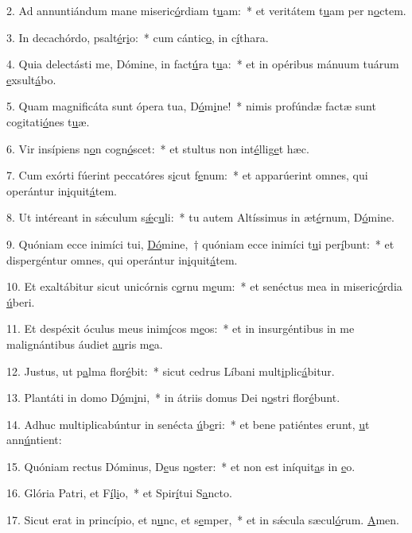 2. Ad annuntiándum mane miseric\uline{ó}rdiam t\uline{u}am:~* et veritátem t\uline{u}am per n\uline{o}ctem.\par 
3. In decachórdo, psalt\uline{é}r\uline{i}o:~* cum cántic\uline{o}, in c\uline{í}thara.\par 
4. Quia delectásti me, Dómine, in fact\uline{ú}ra t\uline{u}a:~* et in opéribus mánuum tuárum \uline{e}xsult\uline{á}bo.\par 
5. Quam magnificáta sunt ópera tua, D\uline{ó}m\uline{i}ne!~* nimis profúndæ factæ sunt cogitati\uline{ó}nes t\uline{u}æ.\par 
6. Vir insípiens n\uline{o}n cogn\uline{ó}scet:~* et stultus non int\uline{é}llig\uline{e}t hæc.\par 
7. Cum exórti fúerint peccatóres s\uline{i}cut f\uline{e}num:~* et apparúerint omnes, qui operántur in\uline{i}quit\uline{á}tem.\par 
8. Ut intéreant in sǽculum s\uline{ǽ}c\uline{u}li:~* tu autem Altíssimus in æt\uline{é}rnum, D\uline{ó}mine.\par 
9. Quóniam ecce inimíci tui, \uline{Dó}mine,~† quóniam ecce inimíci t\uline{u}i per\uline{í}bunt:~* et dispergéntur omnes, qui operántur in\uline{i}quit\uline{á}tem.\par 
10. Et exaltábitur sicut unicórnis c\uline{o}rnu m\uline{e}um:~* et senéctus mea in miseric\uline{ó}rdia \uline{ú}beri.\par 
11. Et despéxit óculus meus inim\uline{í}cos m\uline{e}os:~* et in insurgéntibus in me malignántibus áudiet \uline{au}ris m\uline{e}a.\par 
12. Justus, ut p\uline{a}lma flor\uline{é}bit:~* sicut cedrus Líbani mult\uline{i}plic\uline{á}bitur.\par 
13. Plantáti in domo D\uline{ó}m\uline{i}ni,~* in átriis domus Dei n\uline{o}stri flor\uline{é}bunt.\par 
14. Adhuc multiplicabúntur in senécta \uline{ú}b\uline{e}ri:~* et bene patiéntes erunt, \uline{u}t ann\uline{ú}ntient:\par 
15. Quóniam rectus Dóminus, D\uline{e}us n\uline{o}ster:~* et non est iníquit\uline{a}s in \uline{e}o.\par 
16. Glória Patri, et F\uline{í}l\uline{i}o,~* et Spir\uline{í}tui S\uline{a}ncto.\par 
17. Sicut erat in princípio, et n\uline{u}nc, et s\uline{e}mper,~* et in sǽcula sæcul\uline{ó}rum. \uline{A}men.\par 
